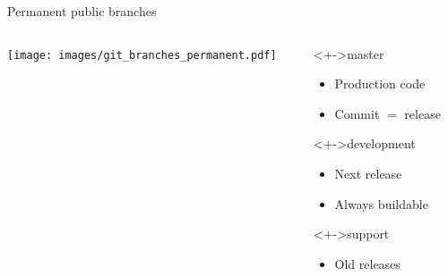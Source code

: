 \documentclass{beamer}
\begin{document}
\begin{frame}{Permanent public branches}
  \begin{columns}
    \begin{column}{6cm}
      \begin{center}
        \texttt{[image: images/git\_branches\_permanent.pdf]}
      \end{center}
    \end{column}
    \begin{column}{5cm}
      \begin{block}<+->{master}
        \begin{itemize}
        \item Production code
        \item Commit $=$ release
        \end{itemize}
      \end{block}
      \begin{block}<+->{development}
        \begin{itemize}
        \item Next release
        \item Always buildable 
        \end{itemize}
      \end{block}
      \begin{block}<+->{support}
        \begin{itemize}
        \item Old releases
        \end{itemize}
      \end{block}
    \end{column}
  \end{columns}
\end{frame}
\end{document}
